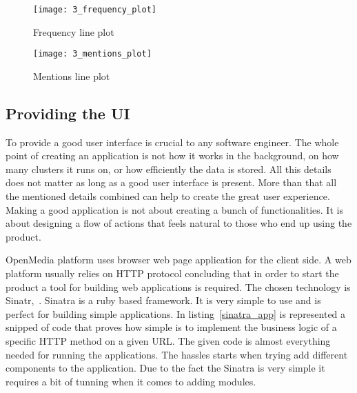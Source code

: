 \begin{figure}[!ht]
\centering
\texttt{[image: 3\_frequency\_plot]}
\caption{Frequency line plot}\label{frequency_plot}
\end{figure}

\begin{figure}[!ht]
\centering
\texttt{[image: 3\_mentions\_plot]}
\caption{Mentions line plot}\label{mentions_plot}
\end{figure}

\clearpage
\subsection{Providing the UI}
To provide a good user interface is crucial to any software engineer. The whole point of creating an application is not how it works in the background, on how many clusters it runs on, or how efficiently the data is stored. All this details does not matter as long as a good user interface is present. More than that all the mentioned details combined can help to create the great user experience. Making a good application is not about creating a bunch of functionalities. It is about designing a flow of actions that feels natural to those who end up using the product.

OpenMedia platform uses browser web page application for the client side. A web platform usually relies on HTTP protocol concluding that in order to start the product a tool for building web applications is required. The chosen technology is \mbox{Sinatr, \cite{sinatra}}. Sinatra is a ruby based framework. It is very simple to use and is perfect for building simple applications. In \mbox{listing \ref{sinatra_app}} is represented a snipped of code that proves how simple is to implement the business logic of a specific HTTP method on a given URL. The given code is almost everything needed for running the applications. The hassles starts when trying add different components to the application. Due to the fact the Sinatra is very simple it requires a bit of tunning when it comes to adding modules.



